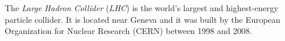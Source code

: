 The \emph{Large Hadron Collider} (\emph{LHC}) is the world's largest and highest-energy particle collider.
It is located near Geneva and it was built by the European Organization for Nuclear Research (CERN) between 1998 and 2008.
